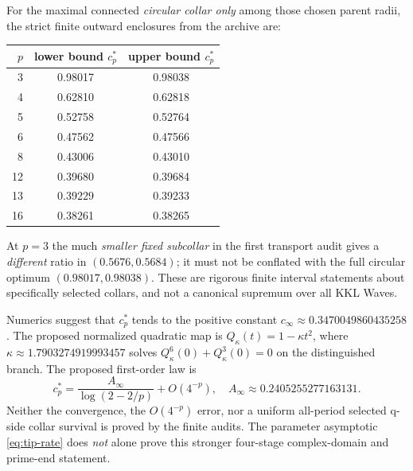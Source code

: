 For the maximal connected
\emph{circular collar only}
among those chosen
parent radii, the strict
finite outward enclosures
from the archive are:
\begin{center}
\begin{tabular}{rcc}
\toprule
$p$& lower bound $c_p^*$& upper bound $c_p^*$\\\midrule
3&0.98017&0.98038\\
4&0.62810&0.62818\\
5&0.52758&0.52764\\
6&0.47562&0.47566\\
8&0.43006&0.43010\\
12&0.39680&0.39684\\
13&0.39229&0.39233\\
16&0.38261&0.38265\\
\bottomrule
\end{tabular}
\end{center}
At $p=3$ the much
\emph{smaller fixed subcollar}
in the first transport
audit gives a \emph{different}
ratio in $(0.5676,0.5684)$;
it must not be conflated
with the full circular
optimum $(0.98017,0.98038)$.
These are rigorous
finite interval statements
about specifically
selected collars, and
not a canonical supremum
over all KKL Waves.

\begin{question}\label{q:crest}
Numerics suggest that
$c_p^*$ tends to the
positive constant
$c_\infty\approx0.3470049860435258$.
The proposed normalized
quadratic map is
$Q_\kappa(t)=1-\kappa t^2$,
where $\kappa\approx1.7903274919993457$
solves
$Q_\kappa^6(0)+Q_\kappa^3(0)=0$
on the distinguished branch.
The proposed first-order
law is
\[
 c_p^*=
 \frac{A_\infty}{\log(2-2/p)}
       +O(4^{-p}),\quad
 A_\infty\approx0.2405255277163131.
\]
Neither the convergence,
the $O(4^{-p})$ error,
nor a uniform all-period
selected q-side collar
survival is proved by
the finite audits.
The parameter asymptotic
\eqref{eq:tip-rate}
does \emph{not} alone
prove this stronger
four-stage
complex-domain and
prime-end statement.
\end{question}

